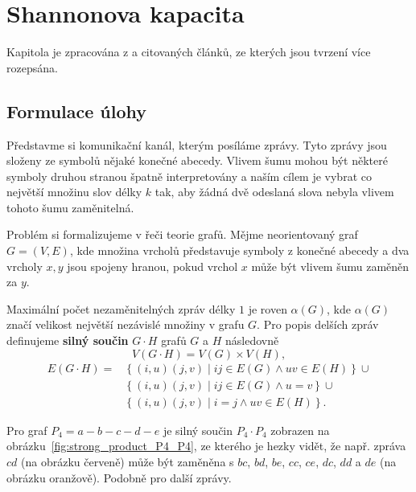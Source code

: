 \chapter{Shannonova kapacita}

Kapitola je zpracována z \cite{approximation-algorithms-and-semidefinite-programming} a citovaných článků, ze kterých jsou  tvrzení více rozepsána.

\section{Formulace úlohy}

Představme si komunikační kanál, kterým posíláme zprávy. Tyto zprávy jsou složeny ze symbolů nějaké konečné abecedy. Vlivem šumu mohou být některé symboly druhou stranou špatně interpretovány a naším cílem je vybrat co největší množinu slov délky $k$ tak, aby žádná dvě odeslaná slova nebyla vlivem tohoto šumu zaměnitelná.

Problém si formalizujeme v řeči teorie grafů. Mějme neorientovaný graf $G = (V, E)$, kde množina vrcholů představuje symboly z konečné abecedy a dva vrcholy $x, y$ jsou spojeny hranou, pokud vrchol $x$ může být vlivem šumu zaměněn za $y$.

Maximální počet nezaměnitelných zpráv délky $1$ je roven $\alpha(G)$, kde $\alpha(G)$ značí velikost největší nezávislé množiny v grafu $G$. Pro popis delších zpráv definujeme \textbf{silný součin} $G \cdot H$ grafů $G$ a $H$ následovně
\begin{equation*}
    V(G \cdot H) = V(G) \times V(H),
\end{equation*}
\begin{equation*}
    \begin{split}
    E(G \cdot H) = &\left\{ (i,u)(j,v) \mid ij \in E(G) \wedge uv \in E(H) \right\} \cup \\
                   &\left\{ (i,u)(j,v) \mid ij \in E(G) \wedge u = v \right\} \cup \\
                   &\left\{ (i,u)(j,v) \mid i = j \wedge uv \in E(H) \right\}.
    \end{split}
\end{equation*}

\begin{pr}
Pro graf $P_4 = a-b-c-d-e$ je silný součin $P_4 \cdot P_4$ zobrazen na obrázku~\ref{fig:strong_product_P4_P4}, ze kterého je hezky vidět, že např. zpráva $cd$ (na obrázku červeně) může být zaměněna s $bc$, $bd$, $be$, $cc$, $ce$, $dc$, $dd$ a $de$ (na obrázku oranžově). Podobně pro další zprávy.
\end{pr}


